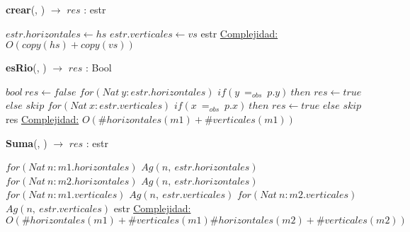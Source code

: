 \begin{Algoritmos}

    \begin{algorithm}[H]{\textbf{crear}(, ) $\to$ $res$ : estr}
        \begin{algorithmic}[1]
            \State $estr.horizontales \gets hs$
            \State $estr.verticales \gets vs$
            \Return estr
            \medskip
            \Statex \underline{Complejidad:} $O(copy(hs) + copy(vs))$
        \end{algorithmic}
    \end{algorithm}

    \begin{algorithm}[H]{\textbf{esRio}(, ) $\to$ $res$ : Bool}
        \begin{algorithmic}[1]
            \State $bool \ res \gets false$
            \State $for(Nat \ y : estr.horizontales)$
            \State \indent $if(y \ = _{obs} \ p.y) \ then$
            \State \indent \indent$res \gets true$
            \State \indent $else$
            \State \indent \indent $skip$
            \State $for(Nat \ x : estr.verticales)$
            \State \indent $if(x \ = _{obs} \ p.x) \ then$
            \State \indent \indent $res \gets true$
            \State \indent $else$
            \State \indent \indent$skip$
            \Return res
            \medskip
            \Statex \underline{Complejidad:} $O( \# horizontales(m1) + \# verticales(m1))$
        \end{algorithmic}
    \end{algorithm}


    \begin{algorithm}[H]{\textbf{Suma}(, ) $\to$ $res$ : estr}
        \begin{algorithmic}[1]
            \State $for(Nat \ n : m1.horizontales)$
            \State \indent $Ag(n, \ estr.horizontales)$
            \State $for(Nat \ n : m2.horizontales)$
            \State \indent $Ag(n, \ estr.horizontales)$
            \State $for(Nat \ n : m1.verticales)$
            \State \indent $Ag(n, \ estr.verticales)$
            \State $for(Nat \ n : m2.verticales)$
            \State \indent $Ag(n, \ estr.verticales)$
            \Return estr
            \medskip
            \Statex \underline{Complejidad:} $O( \# horizontales(m1) + \# verticales(m1) \# horizontales(m2) + \# verticales(m2))$
        \end{algorithmic}
    \end{algorithm}
\end{Algoritmos}
